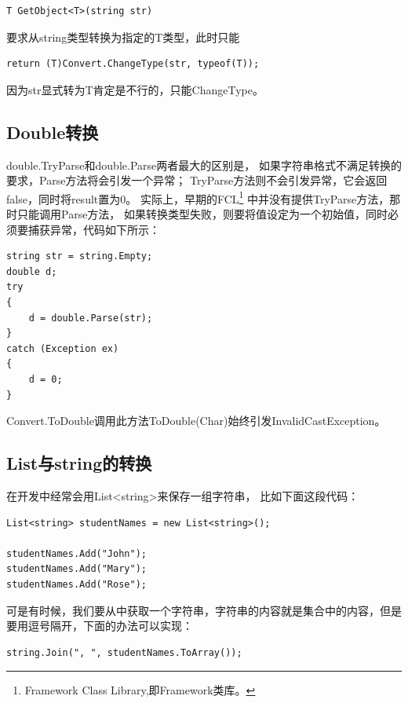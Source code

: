 \documentclass{book}
\begin{document}
\begin{lstlisting}[language={[Sharp]C}]
T GetObject<T>(string str)
\end{lstlisting}

要求从string类型转换为指定的T类型，此时只能

\begin{lstlisting}[language={[Sharp]C}]
return (T)Convert.ChangeType(str, typeof(T));
\end{lstlisting}

因为str显式转为T肯定是不行的，只能ChangeType。

\subsection{Double转换}

double.TryParse和double.Parse两者最大的区别是，
如果字符串格式不满足转换的要求，Parse方法将会引发一个异常；
TryParse方法则不会引发异常，它会返回false，同时将result置为0。
实际上，早期的FCL\footnote{Framework Class Library,即Framework类库。}
中并没有提供TryParse方法，那时只能调用Parse方法，
如果转换类型失败，则要将值设定为一个初始值，同时必须要捕获异常，代码如下所示：

\begin{lstlisting}[language={[Sharp]C}]
string str = string.Empty;  
double d;  
try  
{  
    d = double.Parse(str);  
}  
catch (Exception ex)  
{  
    d = 0;  
}
\end{lstlisting}

Convert.ToDouble调用此方法ToDouble(Char)始终引发InvalidCastException。

\subsection{List与string的转换}

在开发中经常会用List<string>来保存一组字符串，
比如下面这段代码：

\begin{lstlisting}[language={[Sharp]C}]
List<string> studentNames = new List<string>();

studentNames.Add("John");
studentNames.Add("Mary");
studentNames.Add("Rose");
\end{lstlisting}

可是有时候，我们要从中获取一个字符串，字符串的内容就是集合中的内容，但是要用逗号隔开，下面的办法可以实现：

\begin{lstlisting}[language={[Sharp]C}]
string.Join(", ", studentNames.ToArray());
\end{lstlisting}
\end{document}
